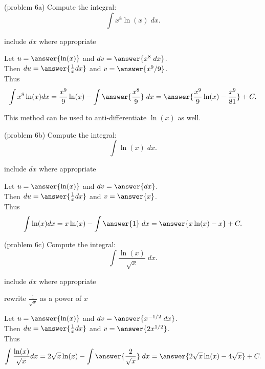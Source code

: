 \documentclass{ximera}
\begin{document}
\begin{problem}(problem 6a)
  Compute the integral:
  \[
  \int x^8 \ln(x) \;dx.
  \]
  
  \begin{hint}
      include $dx$ where appropriate
  \end{hint}
  Let $u = \answer{\ln(x)}$   and   $dv = \answer{x^8 \;dx}$.\\
  Then $du = \answer{\frac{1}{x} dx}$   and   $v = \answer{x^9/9}$.\\
  Thus 
  \[
  \int x^8 \ln(x) dx = \frac{x^9}{9}\ln(x) - \int \answer{\frac{x^8}{9}} \;dx = \answer{\frac{x^9}{9}\ln(x) -\frac{x^9}{81}} + C.
  \]

\end{problem}

This method can be used to anti-differentiate $\ln(x)$ as well.


\begin{problem}(problem 6b) 
  Compute the integral:
  \[
  \int \ln(x) \;dx.
  \]
  
  \begin{hint}
      include $dx$ where appropriate
  \end{hint}
  Let $u = \answer{\ln(x)}$   and   $dv = \answer{dx}$.\\
  Then $du = \answer{\frac{1}{x} dx}$   and   $v = \answer{x}$.\\
  Thus 
  \[
  \int  \ln(x) dx = x\ln(x) - \int \answer{1} \;dx = \answer{x\ln(x) -x} + C.
  \]

\end{problem}

\begin{problem}(problem 6c)
  Compute the integral:
  \[
  \int \frac{\ln(x)}{\sqrt x} \;dx.
  \]
  
  \begin{hint}
      include $dx$ where appropriate
  \end{hint}
  \begin{hint}
      rewrite $\frac{1}{\!\sqrt x}$ as a power of $x$
  \end{hint}
  Let $u = \answer{\ln(x)}$   and   $dv = \answer{x^{-1/2} \;dx}$.\\
  Then $du = \answer{\frac{1}{x} dx}$   and   $v = \answer{2x^{1/2}}$.\\
  Thus 
  \[
  \int \frac{\ln(x)}{\!\sqrt x} dx = 2\sqrt x \ln(x) - \int \answer{\frac{2}{\sqrt x}} \;dx = \answer{2\sqrt x \ln(x) -4\sqrt x} + C.
  \]

\end{problem}
\end{document}
